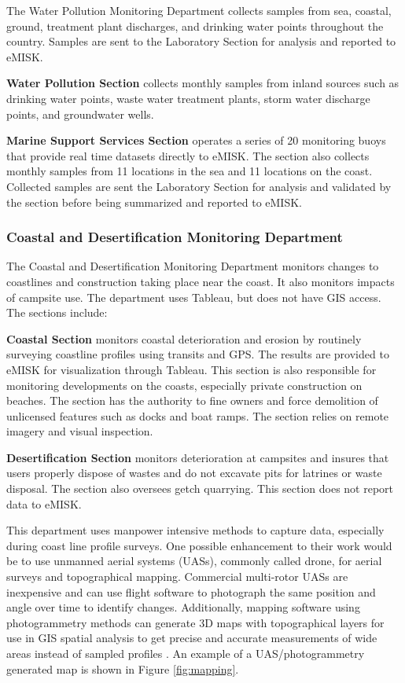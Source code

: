The Water Pollution Monitoring Department collects samples from sea, coastal, ground, treatment plant discharges, and drinking water points throughout the country. Samples are sent to the Laboratory Section for analysis and reported to eMISK.

\textbf{Water Pollution Section} collects monthly samples from inland sources such as drinking water points, waste water treatment plants, storm water discharge points, and groundwater wells.

\textbf{Marine Support Services Section} operates a series of 20 monitoring buoys that provide real time datasets directly to eMISK. The section also collects monthly samples from 11 locations in the sea and 11 locations on the coast. Collected samples are sent the Laboratory Section for analysis and validated by the section before being summarized and reported to eMISK.

\subsubsection{Coastal and Desertification Monitoring Department}
The Coastal and Desertification Monitoring Department monitors changes to coastlines and construction taking place near the coast. It also monitors impacts of campsite use. The department uses Tableau, but does not have GIS access.  The sections include:

\textbf{Coastal Section} monitors coastal deterioration and erosion by routinely surveying coastline profiles using transits and GPS. The results are provided to eMISK for visualization through Tableau. This section is also responsible for monitoring developments on the coasts, especially private construction on beaches. The section has the authority to fine owners and force demolition of unlicensed features such as docks and boat ramps. The section relies on remote imagery and visual inspection. 

\textbf{Desertification Section} monitors deterioration at campsites and insures that users properly dispose of wastes and do not excavate pits for latrines or waste disposal. The section also oversees getch quarrying. This section does not report data to eMISK.

This department uses manpower intensive methods to capture data, especially during coast line profile surveys. One possible enhancement to their work would be to use unmanned aerial systems (UASs), commonly called drone, for aerial surveys and topographical mapping. Commercial multi-rotor UASs are inexpensive and can use flight software to photograph the same position and angle over time to identify changes. Additionally, mapping software using photogrammetry methods can generate 3D maps with topographical layers for use in GIS spatial analysis to get precise and accurate measurements of wide areas instead of sampled profiles \citep{Coveney2017, Lizarazo2017}. An example of a UAS/photogrammetry generated map is shown in Figure \ref{fig:mapping}.

